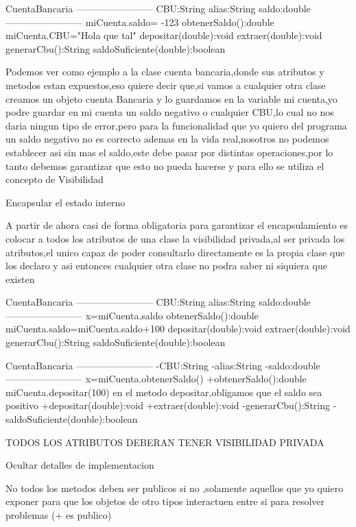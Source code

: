         CuentaBancaria
    ------------------------
    CBU:String
    alias:String
    saldo:double
    ------------------------                            miCuenta.saldo= -123
    obtenerSaldo():double                               miCuenta.CBU="Hola que tal"
    depositar(double):void
    extraer(double):void
    generarCbu():String
    saldoSuficiente(double):boolean    
    
Podemos ver como ejemplo a la clase cuenta bancaria,donde sus atributos y metodos estan expuestos,eso quiere decir que,si vamos a cualquier otra clase creamos un objeto cuenta Bancaria y lo guardamos
en la variable mi cuenta,yo podre guardar en mi cuenta un saldo negativo o cualquier CBU,lo cual no nos daria ningun tipo de error,pero para la funcionalidad que yo quiero del programa un saldo negativo no es correcto
ademas en la vida real,nosotros no podemos establecer asi sin mas el saldo,este debe pasar por distintas operaciones,por lo tanto debemos garantizar que esto no pueda hacerse y para ello se utiliza 
el concepto de Visibilidad

Encapsular el estado interno 

A partir de ahora casi de forma obligatoria para garantizar el encapsulamiento es colocar a todos los atributos de una clase la visibilidad privada,al ser privada los atributos,el unico capaz de poder
consultarlo directamente es la propia clase que los declaro y asi entonces cualquier otra clase no podra saber ni siquiera que existen


CuentaBancaria
------------------------
CBU:String
alias:String
saldo:double
------------------------                            x=miCuenta.saldo
obtenerSaldo():double                               miCuenta.saldo=miCuenta.saldo+100
depositar(double):void
extraer(double):void
generarCbu():String
saldoSuficiente(double):boolean


CuentaBancaria
------------------------
-CBU:String
-alias:String
-saldo:double
------------------------                            x=miCuenta.obtenerSaldo()
+obtenerSaldo():double                              miCuenta.depositar(100) en el metodo depositar,obligamos que el saldo sea positivo
+depositar(double):void
+extraer(double):void
-generarCbu():String
-saldoSuficiente(double):boolean

TODOS LOS ATRIBUTOS DEBERAN TENER VISIBILIDAD PRIVADA


Ocultar detalles de implementacion

No todos los metodos deben ser publicos si no ,solamente aquellos que yo quiero exponer para que los objetos de otro tipos interactuen entre si para resolver problemas (+ es publico)